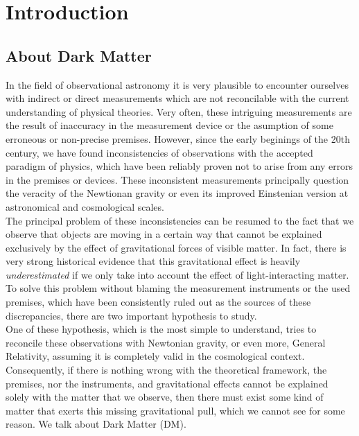\chapter{Introduction}

\section{About Dark Matter}

In the field of observational astronomy it is very plausible to encounter ourselves with indirect or direct measurements which are not reconcilable with the current understanding of physical theories. Very often, these intriguing measurements are the result of inaccuracy in the measurement device or the asumption of some erroneous or non-precise premises. However, since the early beginings of the 20th century, we have found inconsistencies of observations with the accepted paradigm of physics, which have been reliably proven not to arise from any errors in the premises or devices. These inconsistent measurements principally question the veracity of the Newtionan gravity or even its improved Einstenian version at astronomical and cosmological scales.\\

The principal problem of these inconsistencies can be resumed to the fact that we observe that objects are moving in a certain way that cannot be explained exclusively by the effect of gravitational forces of visible matter. In fact, there is very strong historical evidence that this gravitational effect is heavily \textit{underestimated} if we only take into account the effect of light-interacting matter. To solve this problem without blaming the measurement instruments or the used premises, which have been consistently ruled out as the sources of these discrepancies, there are two important hypothesis to study.\\

One of these hypothesis, which is the most simple to understand, tries to reconcile these observations with Newtonian gravity, or even more, General Relativity, assuming it is completely valid in the cosmological context. Consequently, if there is nothing wrong with the theoretical framework, the premises, nor the instruments, and gravitational effects cannot be explained solely with the matter that we observe, then there must exist some kind of matter that exerts this missing gravitational pull, which we cannot see for some reason. We talk about Dark Matter (DM).\\

